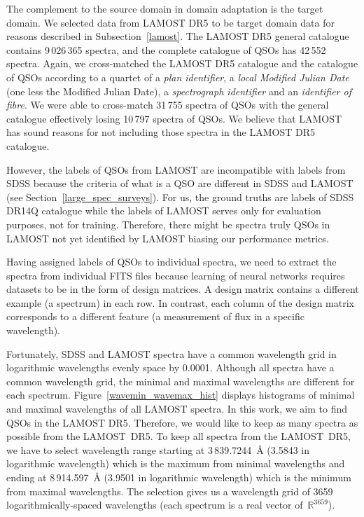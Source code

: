 The complement to the source domain in domain adaptation is the target domain.
We selected data from LAMOST DR5 to be target domain data
for reasons described in Subsection~\ref{lamost}.
The LAMOST DR5 general catalogue contains 9\,026\,365 spectra,
and the complete catalogue of QSOs has 42\,552 spectra.
Again, we cross-matched the LAMOST DR5 catalogue and the catalogue of QSOs
according to a quartet of a \textit{plan identifier}, a \textit{local Modified Julian Date} (one less the Modified Julian Date), a \textit{spectrograph identifier} and an \textit{identifier of fibre}.
We were able to cross-match 31\,755 spectra of QSOs with the general catalogue
effectively losing 10\,797 spectra of QSOs.
We believe that LAMOST has sound reasons for not including those spectra in the LAMOST DR5 catalogue.

However, the labels of QSOs from LAMOST are incompatible with labels from SDSS
because the criteria of what is a QSO are different in SDSS and LAMOST
(see Section~\ref{large_spec_surveys}).
For us, the ground truths are labels of SDSS DR14Q catalogue
while the labels of LAMOST serves only for evaluation purposes,
not for training.
Therefore, there might be spectra truly QSOs in LAMOST
not yet identified by LAMOST biasing our performance metrics.

Having assigned labels of QSOs to individual spectra,
we need to extract the spectra from individual FITS files
because learning of neural networks requires datasets to be in the form of design matrices.
A design matrix contains a different example (a spectrum) in each row.
In contrast, each column of the design matrix corresponds to a different feature
(a measurement of flux in a specific wavelength).~\cite{goodfellow2016}

Fortunately, SDSS and LAMOST spectra have a common wavelength grid in logarithmic wavelengths evenly space by 0.0001.
Although all spectra have a common wavelength grid,
the minimal and maximal wavelengths are different for each spectrum.
Figure~\ref{wavemin_wavemax_hist} displays histograms of minimal and maximal wavelengths of all LAMOST spectra.
In this work, we aim to find QSOs in the LAMOST DR5.
Therefore, we would like to keep as many spectra as possible from the LAMOST~DR5.
To keep all spectra from the LAMOST~DR5,
we have to select wavelength range starting at 3\,839.7244~\AA{} (3.5843 in logarithmic wavelength)
which is the maximum from minimal wavelengths
and ending at 8\,914.597~\AA{} (3.9501 in logarithmic wavelength)
which is the minimum from maximal wavelengths.
The selection gives us a wavelength grid of 3659 logarithmically-spaced wavelengths
(each spectrum is a real vector of~\(\mathbb{R}^{3659}\)).

